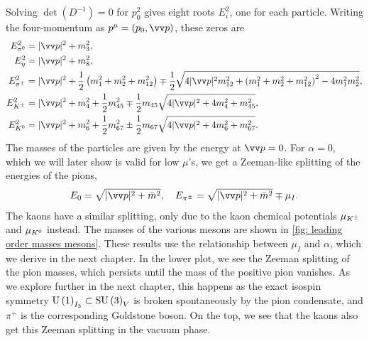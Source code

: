 %
Solving $\det(D^{-1}) = 0$ for $p_0^2$ gives eight roots $E_i^2$, one for each particle.
Writing the four-momentum as $p^\mu = (p_0, \vv p)$, these zeros are
%
\begingroup
\allowdisplaybreaks
\begin{align}
    \label{E1}
    E_{\pi^0}^2 &= |\vv p |^2 + m_3^2, \\
    \label{E2}
    E_\eta^2 &= |\vv p |^2 + m_8^2, \\
    E_\pipm^2
    & = |\vv p|^2 +
    \frac{1}{2}
    \left(
        m_1^2 + m_2^2 + m_{12}^2 
    \right)
    \mp
    \frac{1}{2}
    \sqrt{
        4|\vv p|^2m_{12}^2 
        +
        \left(
            m_1^2 + m_2^2 + m_{12}^2
        \right)^2
        - 4 m_1^2 m_2^2
    }, \\
    \label{E3}
    E_\Kpm^2
    & = |\vv p|^2 + m_4^2 + \frac{1}{2} m_{45}^2 
    \mp
    \frac{1}{2} m_{45} \sqrt{4|\vv p|^2 + 4 m_4^2 + m_{45}^2},\\
    \label{E4}
    E_\Ko^2
    &= |\vv p|^2 + m_6^2 + \frac{1}{2} m_{67}^2 
    \pm
    \frac{1}{2} m_{67} \sqrt{4|\vv p|^2 + 4 m_6^2 + m_{67}^2}.
\end{align}
\endgroup
%
The masses of the particles are given by the energy at $\vv p = 0$.
For $\alpha = 0$, which we will later show is valid for low $\mu$'s, we get a Zeeman-like splitting of the energies of the pions,
%
\begin{equation}
    E_0 =\sqrt{|\vv p|^2 + \bar m^2}, \quad
    E_\pipm = \sqrt{|\vv p|^2 + \bar m^2} \mp \mu_I.
\end{equation}
%
The kaons have a similar splitting, only due to the kaon chemical potentials $\mu_{K^\pm}$ and $\mu_{K^0}$ instead.
The masses of the various mesons are shown in \autoref{fig: leading order masses mesons}.
These results use the relationship between $\mu_I$ and $\alpha$, which we derive in the next chapter.
In the lower plot, we see the Zeeman splitting of the pion masses, which persists until the mass of the positive pion vanishes.
As we explore further in the next chapter, this happens as the exact isospin symmetry $\text{U}\left(1\right)_{I_3} \subset \text{SU}\left(3\right)_V $ is broken spontaneously by the pion condensate, and $\pi^+$ is the corresponding Goldstone boson.
On the top, we see that the kaons also get this Zeeman splitting in the vacuum phase.
%
